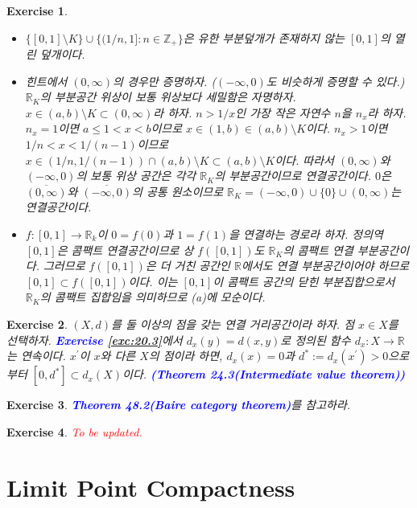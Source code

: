 \documentclass{article}
\newtheorem{exercise}{Exercise}[section]
\newcommand{\R}{\mathbb{R}}
\newcommand{\Z}{\mathbb{Z}}
\begin{document}
\begin{exercise}
    \phantom{}
    \begin{itemize}
        \item[(a)] $\{[0,1]\setminus K\}\cup\{(1/n,1]:n\in\Z_+\}$은 유한 부분덮개가 존재하지 않는 $[0,1]$의 열린 덮개이다.
        \item[(b)] 힌트에서 $(0,\infty)$의 경우만 증명하자. ($(-\infty,0)$도 비슷하게 증명할 수 있다.) $\R_K$의 부분공간 위상이 보통 위상보다 세밀함은 자명하자. $x\in (a,b)\setminus K\subset (0,\infty)$라 하자. $n>1/x$인 가장 작은 자연수 $n$을 $n_x$라 하자. $n_x=1$이면 $a\leq 1<x<b$이므로 $x\in(1,b)\in(a,b)\setminus K$이다. $n_x>1$이면 $1/n<x<1/(n-1)$이므로 $x\in(1/n,1/(n-1))\cap(a,b)\setminus K\subset (a,b)\setminus K$이다. 따라서 $(0,\infty)$와 $(-\infty,0)$의 보통 위상 공간은 각각 $\R_K$의 부분공간이므로 연결공간이다. $0$은 $\overline{(0,\infty)}$와 $\overline{(-\infty,0)}$의 공통 원소이므로 $\R_K=(-\infty,0)\cup\{0\}\cup(0,\infty)$는 연결공간이다.
        \item[(c)] $f:[0,1]\to\R_k$이 $0=f(0)$과 $1=f(1)$을 연결하는 경로라 하자. 정의역 $[0,1]$은 콤팩트 연결공간이므로 상 $f([0,1])$도 $\R_K$의 콤팩트 연결 부분공간이다. 그러므로 $f([0,1])$은 더 거친 공간인 $\R$에서도 연결 부분공간이어야 하므로 $[0,1]\subset f([0,1])$이다. 이는 $[0,1]$이 콤팩트 공간의 닫힌 부분집합으로서 $\R_K$의 콤팩트 집합임을 의미하므로 (a)에 모순이다.
    \end{itemize}
\end{exercise}

\begin{exercise}
    $(X,d)$를 둘 이상의 점을 갖는 연결 거리공간이라 하자. 점 $x\in X$를 선택하자. \textcolor{blue}{\textbf{Exercise \ref{exc:20.3}}}에서 $d_x(y)=d(x,y)$로 정의된 함수 $d_x:X\to\R$는 연속이다. $x^\prime$이 $x$와 다른 $X$의 점이라 하면, $d_x(x)=0$과 $d^*:=d_x(x^\prime)>0$으로부터 $[0,d^*]\subset d_x(X)$이다. \textcolor{blue}{\textbf{(Theorem 24.3(Intermediate value theorem))}}
\end{exercise}

\begin{exercise}
	\label{exc:27.5}
    \textcolor{blue}{\textbf{Theorem 48.2(Baire category theorem)}}를 참고하라.
\end{exercise}

\begin{exercise}
    \textcolor{red}{To be updated.}
\end{exercise}

\section{Limit Point Compactness}
\end{document}
